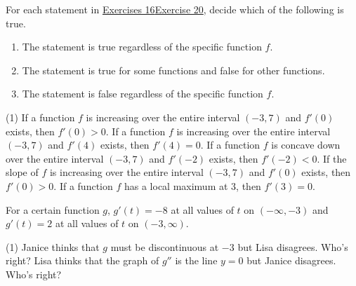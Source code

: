 \documentclass[10pt,oneside,]{book}
\newcommand{\lt}{<}
\newcommand{\gt}{>}
\theoremstyle{plain}
\theoremstyle{definition}
\numberwithin{equation}{section}
\newcommand{\fe}[2]{#1\mathopen{}\left(#2\right)\mathclose{}}
\newcommand{\ointerval}[2]{\left(#1,#2\right)}
\newcommand{\fd}[1]{#1'}
\newcommand{\sd}[1]{#1''}
\begin{document}
For each statement in \hyperlink{exercise-function-statement-first}{Exercises 16}\textendash{}\hyperlink{exercise-function-statement-last}{Exercise 20}, decide which of the following is true. %
\begin{multicols}{3}
\begin{enumerate}[label=(\alph*)]
\item{}The statement is true regardless of the specific function \(f\).\item{}The statement is true for some functions and false for other functions. \item{}The statement is false regardless of the specific function \(f\).\end{enumerate}
\end{multicols}
\par
\begin{exercisegroup}(1)
\exercise[16.]\hypertarget{exercise-function-statement-first}{\null}If a function \(f\) is increasing over the entire interval \(\ointerval{-3}{7}\) and \(\fe{\fd{f}}{0}\) exists, then \(\fe{\fd{f}}{0}\gt0\).%
\exercise[17.]\hypertarget{exercise-314}{\null}If a function \(f\) is increasing over the entire interval \(\ointerval{-3}{7}\) and \(\fe{\fd{f}}{4}\) exists, then \(\fe{\fd{f}}{4}=0\).%
\exercise[18.]\hypertarget{exercise-315}{\null}If a function \(f\) is concave down over the entire interval \(\ointerval{-3}{7}\) and \(\fe{\fd{f}}{-2}\) exists, then \(\fe{\fd{f}}{-2}\lt0\).%
\exercise[19.]\hypertarget{exercise-316}{\null}If the slope of \(f\) is increasing over the entire interval \(\ointerval{-3}{7}\) and \(\fe{\fd{f}}{0}\) exists, then \(\fe{\fd{f}}{0}\gt0\).%
\exercise[20.]\hypertarget{exercise-function-statement-last}{\null}If a function \(f\) has a local maximum at \(3\), then \(\fe{\fd{f}}{3}=0\).%
\end{exercisegroup}
\par\smallskip\noindent
For a certain function \(g\), \(\fe{\fd{g}}{t}=-8\) at all values of \(t\) on \(\ointerval{-\infty}{-3}\) and \(\fe{\fd{g}}{t}=2\) at all values of \(t\) on \(\ointerval{-3}{\infty}\).%
\par
\begin{exercisegroup}(1)
\exercise[21.]\hypertarget{exercise-318}{\null}Janice thinks that \(g\) must be discontinuous at \(-3\) but Lisa disagrees.  Who's right?%
\exercise[22.]\hypertarget{exercise-319}{\null}Lisa thinks that the graph of \(\sd{g}\) is the line \(y=0\) but Janice disagrees.  Who's right?%
\end{exercisegroup}
\par\smallskip\noindent
\end{document}
